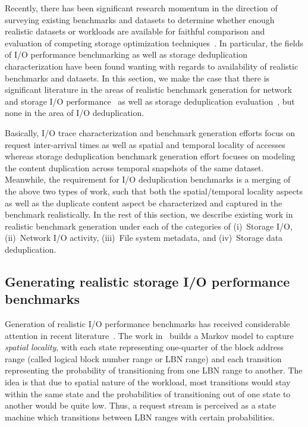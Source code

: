 Recently, there has been significant research momentum in the direction
of surveying existing benchmarks and datasets to determine whether
enough realistic datasets or workloads are available for faithful
comparison and evaluation of competing storage optimization 
techniques~\cite{generating-datasets}.
In particular, the fields of I/O performance benchmarking as well as
storage deduplication characterization have been found wanting
with regards to availability of realistic benchmarks and datasets.
In this section, we make the case that there is significant
literature in the areas of realistic benchmark generation for 
network~\cite{echo} and 
storage I/O performance~\cite{storagecharacterization, storagemodeling,
storagereplay, flexi-replay, decoupling-dc-studies,
case-for-nas-benchmarks, jump-based-synthetic, distiller} as well as storage deduplication
evaluation~\cite{generating-datasets}, but none in the area of I/O deduplication. 

Basically, 
I/O trace characterization and benchmark generation efforts 
focus on request inter-arrival times as well as spatial
and temporal locality of accesses whereas storage
deduplication benchmark generation effort focuses on modeling
the content duplication across temporal snapshots of the same
dataset. Meanwhile, the requirement for I/O deduplication
benchmarks is a merging of the above two types of work, such 
that both the spatial/temporal locality aspects as well as
the duplicate content aspect be characterized and captured 
in the benchmark realistically. In the rest of this section,
we describe existing work in realistic benchmark generation
under each of the categories of (i)~Storage I/O, 
(ii)~Network I/O activity, 
(iii)~File system metadata,
and
(iv)~Storage data deduplication.




\subsection{Generating realistic storage I/O performance benchmarks}
Generation of realistic I/O performance benchmarks
has received considerable attention in recent literature~\cite{storagecharacterization, storagemodeling,
storagereplay, flexi-replay, decoupling-dc-studies,
jump-based-synthetic, distiller}. 
The work in~\cite{storagecharacterization}
builds a Markov model to capture \textit{spatial locality},
with each state representing one-quarter of the 
block address range (called logical block number range or LBN range) 
and each transition representing
the probability of transitioning from one LBN range to another. The idea
is that due to spatial nature of the workload, most
transitions would stay within the same state and the probabilities
of transitioning out of one state to another would be quite low. 
Thus, a request stream is perceived as a state machine 
which transitions between LBN ranges with certain probabilities.


